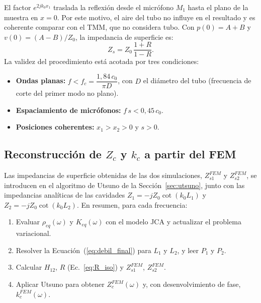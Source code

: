 \documentclass[11pt,a4paper]{article}
\begin{document}
\newpage

El factor $e^{2jk_0x_1}$ traslada la reflexión desde el micrófono $M_1$ hasta el plano de la muestra en $x=0$. Por este motivo, el aire del tubo no influye en el resultado y es coherente comparar con el TMM, que no considera tubo. Con $p(0)=A+B$ y $v(0)=(A-B)/Z_0$, la impedancia de superficie es:
\begin{equation}
Z_s=Z_0\,\frac{1+R}{1-R}.
\end{equation}
La validez del procedimiento está acotada por tres condiciones:
\begin{itemize}[leftmargin=*]
\item \textbf{Ondas planas:} $f<f_c=\dfrac{1{,}84\,c_0}{\pi D}$, con $D$ el diámetro del tubo (frecuencia de corte del primer modo no plano).
\item \textbf{Espaciamiento de micrófonos:} $f\,s<0{,}45\,c_0$.
\item \textbf{Posiciones coherentes:} $x_1>x_2>0$ y $s>0$.
\end{itemize}

\subsection{\texorpdfstring{Reconstrucción de $Z_c$ y $k_c$ a partir del FEM}{Reconstrucción de Z\_c y k\_c a partir del FEM}}
Las impedancias de superficie obtenidas de las dos simulaciones, $Z_{s1}^{FEM}$ y $Z_{s2}^{FEM}$, se introducen en el algoritmo de Utsuno de la Sección~\ref{sec:utsuno}, junto con las impedancias analíticas de las cavidades $Z_1=-jZ_0\cot(k_0L_1)$ y $Z_2=-jZ_0\cot(k_0L_2)$. En resumen, para cada frecuencia:
\begin{enumerate}[label=\arabic*.]
\item Evaluar $\rho_{eq}(\omega)$ y $K_{eq}(\omega)$ con el modelo JCA y actualizar el problema variacional.
\item Resolver la Ecuación~(\ref{eq:debil_final}) para $L_1$ y $L_2$, y leer $P_1$ y $P_2$.
\item Calcular $H_{12}$, $R$ (Ec.~\ref{eq:R_iso}) y $Z_{s1}^{FEM}$, $Z_{s2}^{FEM}$.
\item Aplicar Utsuno para obtener $Z_c^{FEM}(\omega)$ y, con desenvolvimiento de fase, $k_c^{FEM}(\omega)$.
\end{enumerate}

\end{document}
